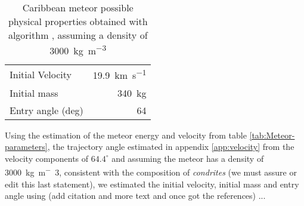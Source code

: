 \begin{table}
    \centering
     \caption{Caribbean meteor possible physical properties obtained with  algorithm  , assuming a density of \SI{3000}{kg.m^{-3}}}
    \begin{tabular}{lr}\toprule
       Initial Velocity  &  \SI{19.9}{km.s^{-1}}\\
        Initial mass & \SI{340}{kg} \\
        Entry angle (deg) & 64 \\
        \bottomrule
    \end{tabular}
    \label{tab:meteor-properties}
\end{table}

Using the estimation of the meteor energy and velocity from table \ref{tab:Meteor-parameters}, the trajectory angle estimated in appendix \ref{app:velocity} from the velocity components of $64.4^\circ$ and assuming the meteor has a density of \SI{3000}{kg.m^-3}, consistent with the composition of \textit{condrites} (we must assure or edit this last statement), we estimated the initial velocity, initial mass and entry angle using (add citation and more text and once got the references) ...%